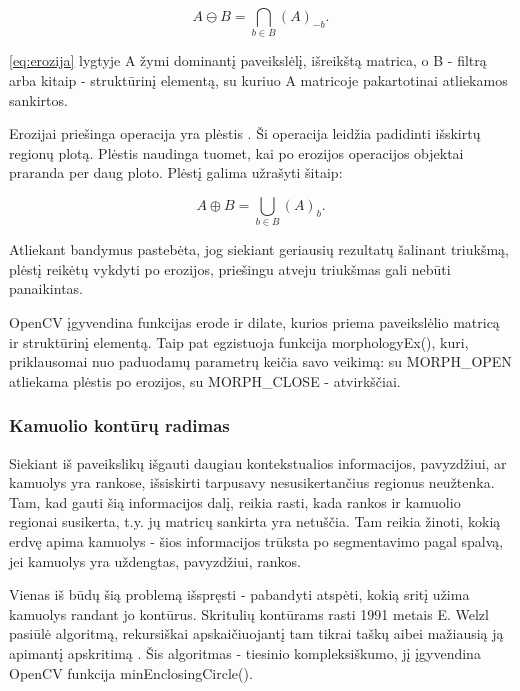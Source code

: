 \documentclass{VUMIFPSbakalaurinis}
\begin{document}
\begin{equation}\label{eq:erozija}
	A \ominus B = \bigcap_ {b \in B } (A)_{-b} .
\end{equation}

\ref{eq:erozija} lygtyje A žymi dominantį paveikslėlį, išreikštą matrica, o B - filtrą arba kitaip - struktūrinį elementą, su kuriuo A matricoje pakartotinai atliekamos sankirtos.  

Erozijai priešinga operacija yra plėstis \cite{4767941}. Ši operacija leidžia padidinti išskirtų regionų plotą. Plėstis naudinga tuomet, kai po erozijos operacijos objektai praranda per daug ploto. Plėstį galima užrašyti šitaip:

\begin{equation}\label{eq:plestis}
	A \oplus B = \bigcup_ {b \in B } (A)_{b} .
\end{equation}

Atliekant bandymus pastebėta, jog siekiant geriausių rezultatų šalinant triukšmą, plėstį reikėtų vykdyti po erozijos, priešingu atveju triukšmas gali nebūti panaikintas. 

OpenCV įgyvendina funkcijas erode ir dilate, kurios priema paveikslėlio matricą ir struktūrinį elementą. Taip pat egzistuoja funkcija morphologyEx(), kuri, priklausomai nuo paduodamų parametrų keičia savo veikimą: su MORPH\_OPEN atliekama plėstis po erozijos, su MORPH\_CLOSE - atvirkščiai. 

\subsubsection{Kamuolio kontūrų radimas}

Siekiant iš paveikslikų išgauti daugiau kontekstualios informacijos, pavyzdžiui, ar kamuolys yra rankose, išsiskirti tarpusavy nesusikertančius regionus neužtenka. Tam, kad gauti šią informacijos dalį, reikia rasti, kada rankos ir kamuolio regionai susikerta, t.y. jų matricų sankirta yra netuščia. Tam reikia žinoti, kokią erdvę apima kamuolys - šios informacijos trūksta po segmentavimo pagal spalvą, jei kamuolys yra uždengtas, pavyzdžiui, rankos. 

Vienas iš būdų šią problemą išspręsti - pabandyti atspėti, kokią sritį užima kamuolys randant jo kontūrus. Skritulių kontūrams rasti 1991 metais E. Welzl pasiūlė algoritmą, rekursiškai apskaičiuojantį tam tikrai taškų aibei mažiausią ją apimantį apskritimą \cite{Welzl91smallestenclosing}. Šis algoritmas - tiesinio kompleksiškumo, jį įgyvendina OpenCV funkcija minEnclosingCircle().       
\end{document}
